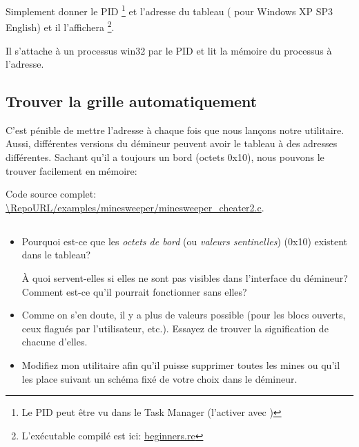 

Simplement donner le \ac{PID}
\footnote{Le PID peut être vu dans le Task Manager
(l'activer avec )}
et l'adresse du tableau ( pour Windows XP SP3 English)
et il l'affichera
\footnote{L'exécutable compilé est ici:
\href{http://go.yurichev.com/17165}{beginners.re}}.

Il s'attache à un processus win32 par le \ac{PID} et lit la mémoire du processus
à l'adresse.

\subsection{Trouver la grille automatiquement}

C'est pénible de mettre l'adresse à chaque fois que nous lançons notre utilitaire.
Aussi, différentes versions du démineur peuvent avoir le tableau à des adresses différentes.
Sachant qu'il a toujours un bord (octets 0x10), nous pouvons le trouver facilement
en mémoire:



Code source complet: \url{\RepoURL/examples/minesweeper/minesweeper_cheater2.c}.

\subsection{\Exercises}

\begin{itemize}

\item 
Pourquoi est-ce que les \emph{octets de bord} (ou \emph{valeurs sentinelles}) (0x10)
existent dans le tableau?

À quoi servent-elles si elles ne sont pas visibles dans l'interface du démineur?
Comment est-ce qu'il pourrait fonctionner sans elles?

\item 
Comme on s'en doute, il y a plus de valeurs possible (pour les blocs ouverts, ceux
flagués par l'utilisateur, etc.).
Essayez de trouver la signification de chacune d'elles.

\item 
Modifiez mon utilitaire afin qu'il puisse supprimer toutes les mines ou qu'il les
place suivant un schéma fixé de votre choix dans le démineur.

\end{itemize}
